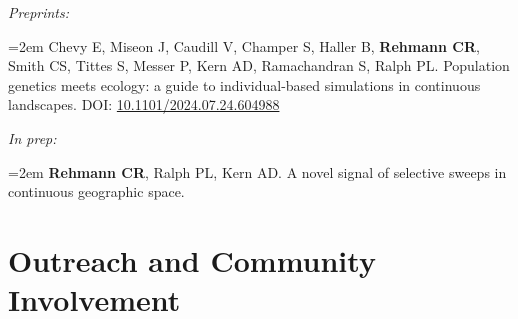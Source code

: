 \documentclass[11pt]{extarticle}
\newcommand{\NewPart}[1]{\section*{{#1}}}
\begin{document}
\vspace{2.5mm}
\textit{Preprints:}

\noindent\hangindent=2em Chevy E, Miseon J, Caudill V, Champer S, Haller B, \textbf{Rehmann CR}, Smith CS, Tittes S, Messer P, Kern AD, Ramachandran S, Ralph PL. Population genetics meets ecology: a guide to individual-based simulations in continuous landscapes. DOI: \href{doi.org/10.1101/2024.07.24.604988}{10.1101/2024.07.24.604988}

\vspace{2.5mm}
\textit{In prep:}

\noindent\hangindent=2em \textbf{Rehmann CR}, Ralph PL, Kern AD. A novel signal of selective sweeps in continuous geographic space.

\NewPart{Outreach and Community Involvement}
\end{document}
